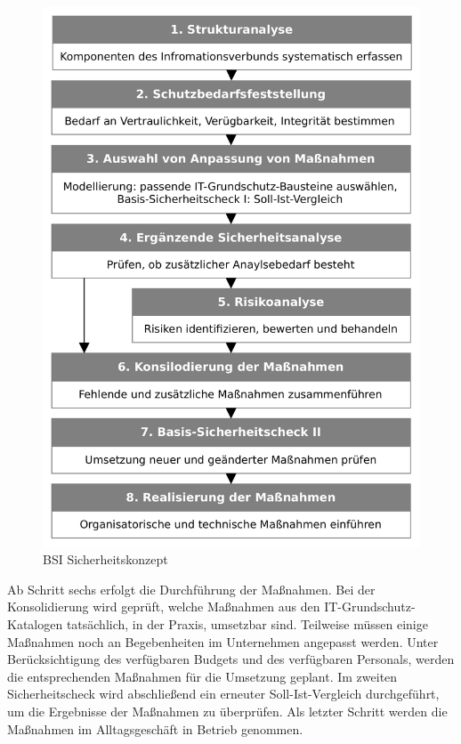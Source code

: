 \documentclass[11pt,a4paper]{report}
\begin{document}
\begin{figure}[htbp]
\centering
\includegraphics[scale=0.35]{images/bsi_sicherheitskonzept.pdf}
\caption[BSI Sicherheitskonzept]{BSI Sicherheitskonzept\footnotemark}
\label{fig:bsi_sicherheit}
\end{figure}

Ab Schritt sechs erfolgt die Durchführung der Maßnahmen. Bei der Konsolidierung wird geprüft, welche Maßnahmen aus den IT-Grundschutz-Katalogen tatsächlich, in der Praxis, umsetzbar sind. Teilweise müssen einige Maßnahmen noch an Begebenheiten im Unternehmen angepasst werden. Unter Berücksichtigung des verfügbaren Budgets und des verfügbaren Personals, werden die entsprechenden Maßnahmen für die Umsetzung geplant. Im zweiten Sicherheitscheck wird abschließend ein erneuter Soll-Ist-Vergleich durchgeführt, um die Ergebnisse der Maßnahmen zu überprüfen. Als letzter Schritt werden die Maßnahmen im Alltagsgeschäft in Betrieb genommen.
\end{document}
